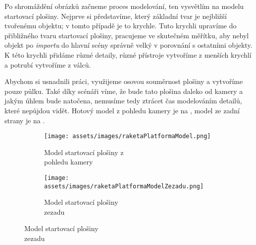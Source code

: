 {Po shromáždění obrázků začneme proces modelování, ten vysvětlím na modelu startovací plošiny. Nejprve si představíme, který základní tvar je nejbližší tvořenému objektu; v tomto případě je to krychle. Tuto krychli upravíme do přibližného tvaru startovací plošiny, pracujeme ve skutečném měřítku, aby nebyl objekt po \textit{importu} do hlavní scény správně velký v porovnání s ostatními objekty. K této krychli přidáme různé detaily, různé přístroje vytvoříme z menších krychlí a potrubí vytvoříme z válců.}

\newpage

{Abychom si usnadnili práci, využijeme osovou souměrnost plošiny a vytvoříme pouze půlku. Také díky scénáři víme, že bude tato plošina daleko od kamery a jakým úhlem bude natočena, nemusíme tedy ztrácet čas modelováním detailů, které nepůjdou vidět. Hotový model z pohledu kamery je na , model ze zadní strany je na .}

\begin{figure}[H]
    \centering

    \begingroup
    \makeatletter
    \renewcommand\thesubfigure{\thefigure~--~\@nameuse{subfiglabel@\alph{subfigure}}}
    \newcommand{\subfiglabel@a}{vlevo}
    \newcommand{\subfiglabel@b}{vpravo}
    \captionsetup[subfigure]{labelformat=simple, labelsep=colon}
    \renewcommand\p@subfigure{}
    \makeatother

    \begin{subfigure}{.48\textwidth}
        \centering
        \texttt{[image: assets/images/raketaPlatformaModel.png]}
        \caption{Model startovací plošiny z \\pohledu kamery \jaObr}
        \label{obr:plosinaModel}
    \end{subfigure}
    \hfill
    \begin{subfigure}{.48\textwidth}
        \centering
        \texttt{[image: assets/images/raketaPlatformaModelZezadu.png]}
        \caption{Model startovací plošiny \\zezadu \jaObr}
        \label{obr:plosinaModelZezadu}
    \end{subfigure}

    \endgroup

\end{figure}

